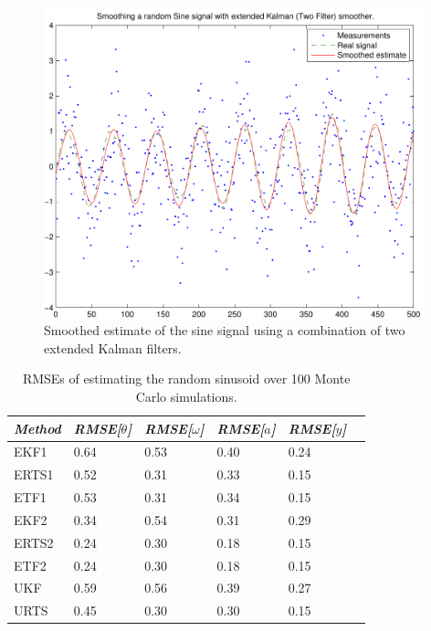 \begin{figure}
\begin{center}
\includegraphics[width=11cm]{pics/demo2_f3}
\caption{Smoothed estimate of the sine signal using a combination of
two extended Kalman filters.}
\label{fig:example2_3}
\end{center}
\end{figure}


\begin{table}
\begin{center}
\begin{tabular}{|l|l|l|l|l|l|} \hline {\it Method}&{\it
RMSE[$\theta$]}&{\it RMSE[$\omega$]}&{\it RMSE[$a$]}& {\it
RMSE[$y$]}\\ \hline EKF1 & 0.64 & 0.53 & 0.40 & 0.24 \\ ERTS1& 0.52 &
0.31 & 0.33 & 0.15 \\ ETF1& 0.53 & 0.31 & 0.34 & 0.15 \\ EKF2 & 0.34 &
0.54 & 0.31 & 0.29 \\ ERTS2& 0.24 & 0.30 & 0.18 & 0.15 \\ ETF2& 0.24 &
0.30 & 0.18 & 0.15 \\ UKF & 0.59 & 0.56 & 0.39 & 0.27 \\ URTS & 0.45 &
0.30 & 0.30 & 0.15 \\ \hline
\end{tabular}
\caption{RMSEs of estimating the random sinusoid over 100 Monte Carlo
simulations.}
\label{table:sine_errors}
\end{center}
\end{table}



%
